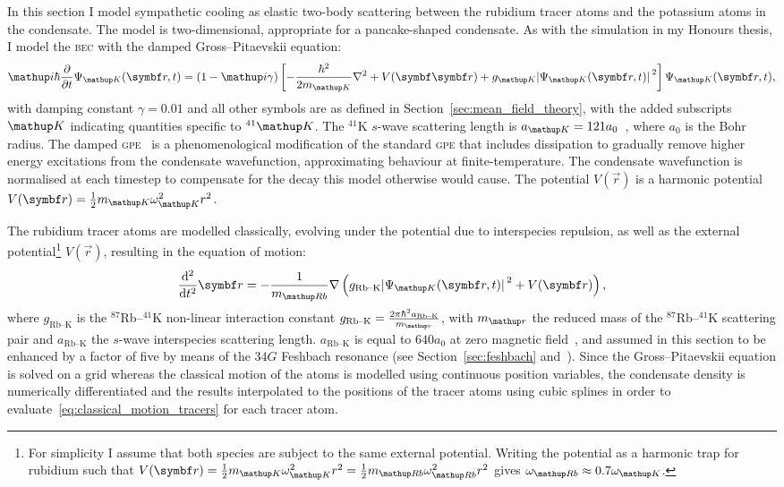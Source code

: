 In this section I model sympathetic cooling as elastic two-body scattering between the rubidium tracer atoms and the potassium atoms in the condensate. The model is two-dimensional, appropriate for a pancake-shaped condensate. As with the simulation in my Honours thesis, I model the \textsc{bec} with the damped Gross--Pitaevskii equation:
\begin{align}
\ii\hbar\pdv{t} \Psi_\up{K}(\vec r, t) = (1-\ii\gamma)\left[-\frac{\hbar^2}{2m_\up{K}}\nabla^2 + V(\vec{\vec r}) + g_\up{K}\abs{\Psi_\up{K}(\vec r, t)}^2\right]\Psi_\up{K}(\vec r, t),
\end{align}
with damping constant $\gamma=0.01$ and all other symbols are as defined in Section~\ref{sec:mean_field_theory}, with the added subscripts $\up{K}$ indicating quantities specific to $^{41}\up{K}$. The $^{41}$K $s$-wave scattering length is $a_\up{K}=121 a_0$~\cite{cote_potassium_1998}, where $a_0$ is the Bohr radius. The damped \textsc{gpe}~\cite{tsubota_vortex_2002, madarassy_vortex_2008} is a phenomenological modification of the standard \textsc{gpe} that includes dissipation to gradually remove higher energy excitations from the condensate wavefunction, approximating behaviour at finite-temperature. The condensate wavefunction is normalised at each timestep to compensate for the decay this model otherwise would cause. The potential $V(\vec r)$ is a harmonic potential $ V(\vec r) = \frac12m_\up{K}\omega_\up{K}^2 r^2$.

The rubidium tracer atoms are modelled classically, evolving under the potential due to interspecies repulsion, as well as the external potential\footnote{For simplicity I assume that both species are subject to the same external potential. Writing the potential as a harmonic trap for rubidium such that $V(\vec r) = \frac12m_\up{K}\omega_\up{K}^2 r^2 = \frac12m_\up{Rb}\omega_\up{Rb}^2 r^2$ gives $\omega_\up{Rb} \approx 0.7\omega_\up{K}$.} $V(\vec r)$, resulting in the equation of motion:
\begin{align}\label{eq:classical_motion_tracers}
\dv[2]{t} \vec r = -\frac1{m_\up{Rb}}\nabla\left({g_{\textrm{Rb--K}}} \abs{\Psi_\up{K}(\vec r, t)}^2 + V(\vec r)\right),
\end{align}
where $g_{\textrm{Rb--K}}$ is the $^{87}$Rb--$^{41}$K non-linear interaction constant $g_{\textrm{Rb--K}} = \frac{2\pi\hbar^2 a_{\textrm{Rb--K}}}{m_\up{r}}$,
with $m_\up{r}$ the reduced mass of the $^{87}$Rb--$^{41}$K scattering pair and 
$a_{\textrm{Rb--K}}$ the $s$-wave interspecies scattering length. $a_{\textrm{Rb--K}}$ is equal to $640 a_0$ at zero magnetic field~\cite{thalhammer_double_2008}, and assumed in this section to be enhanced by a factor of five by means of the $34\unit{G}$ Feshbach resonance (see Section~\ref{sec:feshbach} and~). Since the Gross--Pitaevskii equation is solved on a grid whereas the classical motion of the atoms is modelled using continuous position variables, the condensate density is numerically differentiated and the results interpolated to the positions of the tracer atoms using cubic splines in order to evaluate~\eqref{eq:classical_motion_tracers} for each tracer atom.


